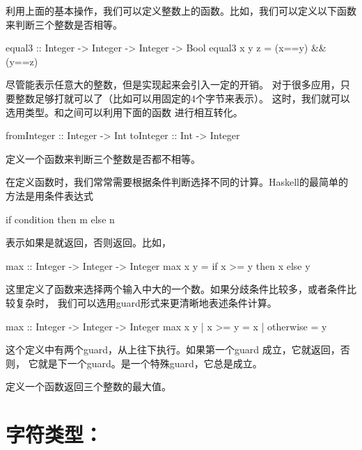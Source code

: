 利用上面的基本操作，我们可以定义整数上的函数。比如，我们可以定义以下函数来判断三个整数是否相等。
\begin{code}
equal3 :: Integer -> Integer -> Integer -> Bool
equal3 x y z = (x==y) && (y==z)
\end{code}

\begin{remark}
  尽管能表示任意大的整数，但是实现起来会引入一定的开销。
对于很多应用，只要整数足够打就可以了（比如可以用固定的4个字节来表示）。
这时，我们就可以选用类型。和之间可以利用下面的函数
进行相互转化。
\begin{xcode}
fromInteger :: Integer -> Int
toInteger   :: Int -> Integer
\end{xcode}
\end{remark}

\begin{exercise}
定义一个函数来判断三个整数是否都不相等。
\end{exercise}

在定义函数时，我们常常需要根据条件判断选择不同的计算。Haskell的最简单的方法是用条件表达式
\begin{xcode}
if condition then m else n
\end{xcode}
表示如果是就返回，否则返回。比如，
\begin{code}
max :: Integer -> Integer -> Integer
max x y = if x >= y then x else y
\end{code}
这里定义了函数来选择两个输入中大的一个数。如果分歧条件比较多，或者条件比较复杂时，
我们可以选用guard形式来更清晰地表述条件计算。
\begin{code}
max :: Integer -> Integer -> Integer
max x y
  | x >= y    = x
  | otherwise = y
\end{code}
这个定义中有两个guard，从上往下执行。如果第一个guard  成立，它就返回，否则，
它就是下一个guard。是一个特殊guard，它总是成立。

\begin{exercise}
定义一个函数返回三个整数的最大值。
\end{exercise}

\section{字符类型：}

